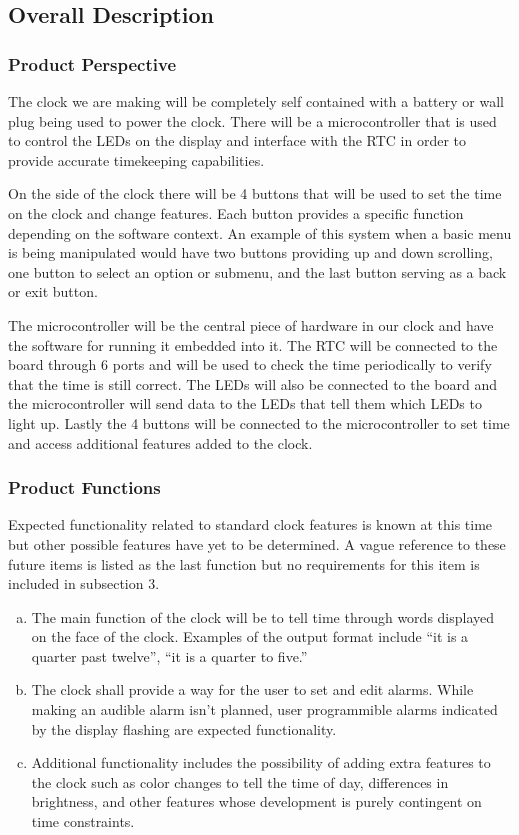 \documentclass[onecolumn, draftclsnofoot,10pt, compsoc]{IEEEtran}
\begin{document}
\subsection{Overall Description}
\subsubsection{Product Perspective}
The clock we are making will be completely self contained with a battery
or wall plug being used to power the clock. There will be a microcontroller that is used to
control the LEDs on the display and interface with the RTC in order to provide accurate
timekeeping capabilities.

On the side of the clock there will be 4 buttons that will be used to set the time on the
clock and change features. Each button provides a specific function depending on the software
context. An example of this system when a basic menu is being manipulated would have two
buttons providing up and down scrolling, one button to select an option or submenu, and the
last button serving as a back or exit button.

The microcontroller will be the central piece of hardware in our clock and have the software
for running it embedded into it. The RTC will be connected to the board through 6 ports and
will be used to check the time periodically to verify that the time is still correct. The LEDs
will also be connected to the board and the microcontroller will send data to the LEDs that
tell them which LEDs to light up. Lastly the 4 buttons will be connected to the
microcontroller to set time and access additional features added to the clock.

\subsubsection{Product Functions}
Expected functionality related to standard clock features is known at this time
but other possible features have yet to be determined. A vague reference to these
future items is listed as the last function but no requirements for this item
is included in subsection 3.
\begin{enumerate}[a)]
  \item The main function of the clock will be to tell time through words displayed on the face of the
clock. Examples of the output format include “it is a quarter past twelve”, “it is a quarter to
five.”
  \item The clock shall provide a way for the user to set and edit alarms. While
  making an audible alarm isn't planned, user programmible alarms indicated by
  the display flashing are expected functionality.
  \item Additional functionality includes the possibility of adding extra features to the clock such as
color changes to tell the time of day, differences in brightness, and other features whose
development is purely contingent on time constraints.
\end{enumerate}
\end{document}
